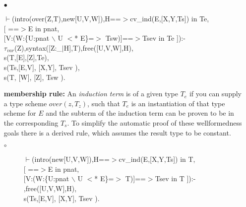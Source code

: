 \documentclass[11pt]{report}
\begin{document}
\begin{enumerate}
\begin{description}
 \end{description}
 \item[$\bullet$]
\begin{sf}\begin{tabbing}
$\vdash$(intro(over(Z,T),new[U,V,W]),H==$>$cv\_\hspace{0.1em}ind(E,[X,Y,Ts]) in Te,\\[-0.15ex]
\hspace{2em}[ ==$>$E in pnat, \\[-0.15ex]
\hspace{3em}[V:(W:\{U:pnat $\backslash$ U $<$* E\}=$>$ Tsw)]==$>$Tsev in Te ]):-\\[-0.15ex]
\hspace{2em}$\tau_{var}$(Z),syntax([Z:\_\hspace{0.1em}$\mid$H],T),free([U,V,W],H),\\[-0.15ex]
\hspace{2em}s(T,[E],[Z],Te),\\[-0.15ex]
\hspace{2em}s(Ts,[E,V], [X,Y], Tsev ),\\[-0.15ex]
\hspace{2em}s(T, [W], [Z], Tsw ).
\end{tabbing}\end{sf}

 {\bf membership rule:}
 An \emph{induction term} is of a given type $T_e$ if you can
 supply a type scheme $over(z,T_z)$, such that $T_e$ is an
 instantiation of that type scheme for $E$ and the subterm of
 the induction term can be proven to be in the corresponding
 $T_s$. To simplify
 the automatic proof of these wellformedness goals there is
 a derived rule, which assumes the result type to be constant.
 \begin{description}
 \item[$\circ$]
\begin{sf}\begin{tabbing}
$\vdash$(intro(new[U,V,W]),H==$>$cv\_\hspace{0.1em}ind(E,[X,Y,Ts]) in T,\\[-0.15ex]
\hspace{2em}[ ==$>$E in pnat,\\[-0.15ex]
\hspace{3em}[V:(W:\{U:pnat $\backslash$ U $<$* E\}=$>$ T)]==$>$Tsev in T ]):-\\[-0.15ex]
\hspace{2em}{\bf derived},free([U,V,W],H),\\[-0.15ex]
\hspace{2em}s(Ts,[E,V], [X,Y], Tsev ).
\end{tabbing}\end{sf}


\end{description}
\end{enumerate}
\end{document}
